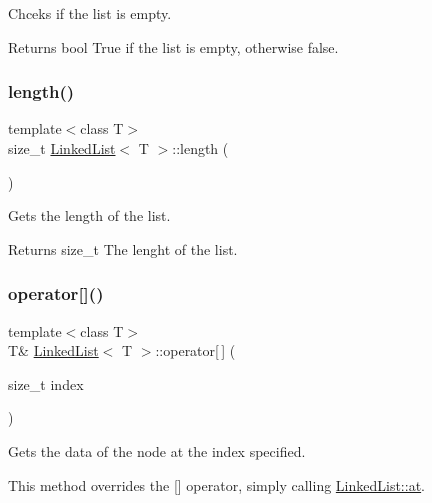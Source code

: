 Chceks if the list is empty. 

\begin{DoxyReturn}{Returns}
bool True if the list is empty, otherwise false. 
\end{DoxyReturn}
\mbox{\label{classLinkedList_a4b766729a31801b6fafdb6170646d318}} 
\subsubsection{\texorpdfstring{length()}{length()}}
{\footnotesize\ttfamily template$<$class T$>$ \\
size\+\_\+t \hyperlink{classLinkedList}{Linked\+List}$<$ T $>$\+::length (\begin{DoxyParamCaption}{ }\end{DoxyParamCaption})\hspace{0.3cm}{\ttfamily [inline]}}



Gets the length of the list. 

\begin{DoxyReturn}{Returns}
size\+\_\+t The lenght of the list. 
\end{DoxyReturn}
\mbox{\label{classLinkedList_acccbb0e5eaeb88c5a1557fed87131727}} 
\subsubsection{\texorpdfstring{operator[]()}{operator[]()}}
{\footnotesize\ttfamily template$<$class T$>$ \\
T\& \hyperlink{classLinkedList}{Linked\+List}$<$ T $>$\+::operator\mbox{[}$\,$\mbox{]} (\begin{DoxyParamCaption}\item[{size\+\_\+t}]{index }\end{DoxyParamCaption})\hspace{0.3cm}{\ttfamily [inline]}}



Gets the data of the node at the index specified. 

This method overrides the \mbox{[}\mbox{]} operator, simply calling \hyperlink{classLinkedList_a2793ba03677f44075c0529dffe0b0d5a}{Linked\+List\+::at}.


